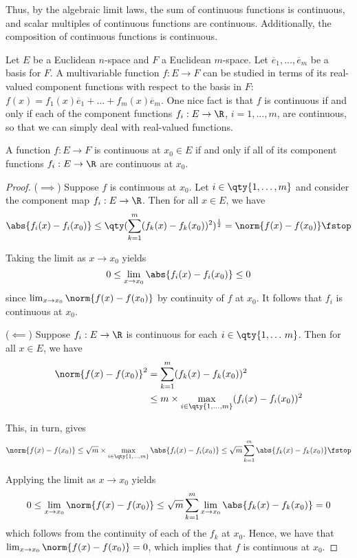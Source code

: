  Thus, by the algebraic limit laws, the sum of continuous functions is continuous, and scalar multiples of continuous functions are continuous. Additionally, the composition of continuous functions is continuous.

 \vspace{3mm}

 Let \( E \) be a Euclidean \( n \)-space and \( F \) a Euclidean \( m \)-space. Let \( \overline{e}_1,\dots,\overline{e}_m \) be a basis for \( F \). A multivariable function \( f:E\to F \) can be studied in terms of its real-valued component functions with respect to the basis in \( F \): \( f(x)=f_1(x)\overline{e}_1+\dots+f_m(x)\overline{e}_m \). One nice fact is that \( f \) is continuous if and only if each of the component functions \( f_i:E\to\R \), \( i=1,\dots, m \), are continuous, so that we can simply deal with real-valued functions.
 \begin{proposition}
   \label{thm:comp-cont}
   A function \( f:E\to F \) is continuous at \( x_0\in E \) if and only if all of its component functions \( f_i:E\to\R \) are continuous at \( x_0 \).
 \end{proposition}
 \begin{proof}
   (\( \implies \)) Suppose \( f \) is continuous at \( x_0 \). Let \( i\in\qty{1,\dots,m} \) and consider the component map \( f_i:E\to\R \). Then for all \( x\in E \), we have
   \[ \abs{f_i(x)-f_i(x_0)}\leq\qty(\sum_{k=1}^m(f_k(x)-f_k(x_0))^2)^{\frac{1}{2}}=\norm{f(x)-f(x_0)}\fstop \]

   Taking the limit as \( x\to x_0 \) yields
   \[ 0\leq\lim_{x\to x_0}\abs{f_i(x)-f_i(x_0)}\leq 0 \]
   since \( \lim_{x\to x_0}\norm{f(x)-f(x_0)} \) by continuity of \( f \) at \( x_0 \). It follows that \( f_i \) is continuous at \( x_0 \).

   \vspace{3mm}

   (\( \impliedby \)) Suppose \( f_i:E\to\R \) is continuous for each \( i\in\qty{1,\dots\,m} \). Then for all \( x\in E \), we have
   \begin{align*}
     \norm{f(x)-f(x_0)}^2&=\sum_{k=1}^m(f_k(x)-f_k(x_0))^2\\
     &\leq m\times\max_{i\in\qty{1,\dots,m}}(f_i(x)-f_i(x_0))^2
   \end{align*}

   This, in turn, gives
   \[ \norm{f(x)-f(x_0)}\leq \sqrt{m}\times\max_{i\in\qty{1,\dots,m}}\abs{f_i(x)-f_i(x_0)}\leq\sqrt{m}\sum_{k=1}^m\abs{f_k(x)-f_k(x_0)}\fstop \]

   Applying the limit as \( x\to x_0 \) yields
   \[ 0\leq\lim_{x\to x_0}\norm{f(x)-f(x_0)}\leq\sqrt{m}\sum_{k=1}^m\lim_{x\to x_0}\abs{f_k(x)-f_k(x_0)}=0 \]
   which follows from the continuity of each of the \( f_k \) at \( x_0 \). Hence, we have that \( \lim_{x\to x_0}\norm{f(x)-f(x_0)}=0 \), which implies that \( f \) is continuous at \( x_0 \).
 \end{proof}

